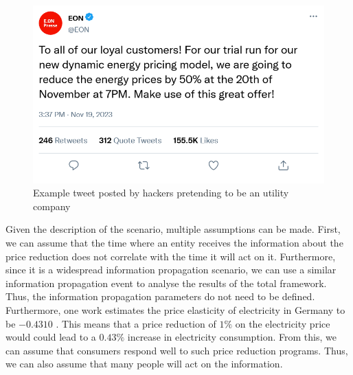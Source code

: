 \begin{figure}[!ht]
    \center
    \includegraphics[scale=.4]{figs/eondemandresponse.png}
    \caption{Example tweet posted by hackers pretending to be an utility company}
    \label{demandtweet}
\end{figure}

Given the description of the scenario, multiple assumptions can be made.
First, we can assume that the time where an entity receives the information
about the price reduction does not correlate with the time it will act on
it. Furthermore, since it is a widespread information propagation scenario,
we can use a similar information propagation event to analyse the 
results of the total framework. Thus, the information propagation
parameters do not need to be defined. Furthermore, one work estimates 
the price elasticity of electricity in Germany to be $-0.4310$
\cite{priceelasticity}. 
This means that a price reduction of $1\%$
on the electricity price would could lead to a $0.43\%$ increase in
electricity consumption. From this, we can assume that consumers 
respond well to such price reduction programs. Thus, we can also assume 
that many people will act on the information.


